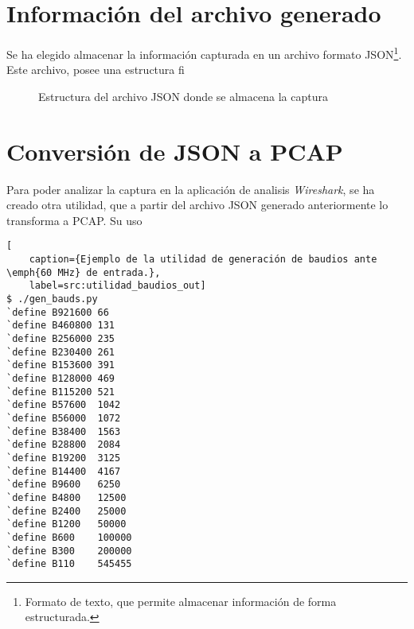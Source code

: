 \section{Información del archivo generado}
Se ha elegido almacenar la información capturada en un archivo formato JSON\footnote{Formato de texto, que permite almacenar información de forma estructurada.}. Este archivo, posee una estructura fi

\begin{figure}[!hbtp]
    \centering
    \begin{minipage}{5cm}
    \end{minipage}
    \caption{Estructura del archivo JSON donde se almacena la captura}
    \label{fig:tree-json}
\end{figure}

\section{Conversión de JSON a PCAP}
Para poder analizar la captura en la aplicación de analisis \emph{Wireshark}, se ha creado otra utilidad, que a partir del archivo JSON generado anteriormente lo transforma a PCAP.
Su uso 

\begin{lstlisting}[
    caption={Ejemplo de la utilidad de generación de baudios ante \emph{60 MHz} de entrada.},
    label=src:utilidad_baudios_out]
$ ./gen_bauds.py
`define B921600 66
`define B460800 131
`define B256000 235
`define B230400 261
`define B153600 391
`define B128000 469
`define B115200 521
`define B57600  1042
`define B56000  1072
`define B38400  1563
`define B28800  2084
`define B19200  3125
`define B14400  4167
`define B9600   6250
`define B4800   12500
`define B2400   25000
`define B1200   50000
`define B600    100000
`define B300    200000
`define B110    545455
\end{lstlisting}





